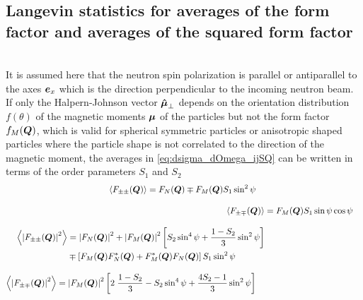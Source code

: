 \subsection{Langevin statistics for averages of the form factor and averages of the squared form factor}
~\\

 It is assumed here that the neutron spin polarization is
parallel or antiparallel to the axes $\BM{e}_x$ which is the
direction perpendicular to the incoming neutron beam. If only the
Halpern-Johnson vector $\BM{\hat{\mu}}_\perp$ depends on the
orientation distribution $f(\theta)$ of the magnetic moments
$\BM{\mu}$ of the particles but not the form factor $f_M(\BM{Q})$,
which is valid for spherical symmetric particles or anisotropic
shaped particles where the particle shape is not correlated to the
direction of the magnetic moment, the averages in
\ref{eq:dsigma_dOmega_ijSQ} can be written in terms of the order
parameters $S_1$ and $S_2$
\begin{subequations}
\label{eq:plugin:F_ijSQ}
\begin{align}
\begin{split}
\left\langle F_{\pm\pm}(\BM{Q})\right\rangle &=  F_N(\BM{Q})
\mp F_M(\BM{Q})S_1\sin^2\psi
\end{split} \\[3mm]
\left\langle F_{\pm\mp}(\BM{Q})\right\rangle &= F_M(\BM{Q})S_1\sin\psi\cos\psi  \\[3mm]
\begin{split}
\left\langle \abs{F_{\pm\pm}(\BM{Q})}^2\right\rangle &= \abs{F_N(\BM{Q})}^2+\abs{F_M(\BM{Q})}^2 \left[S_2 \sin^4\psi+ \frac{1-S_2}{3} \sin^2\psi\right] \\
                                       & \mp \left[F_M(\BM{Q})F^*_N(\BM{Q})+F^*_M(\BM{Q})F_N(\BM{Q})\right]S_1\sin^2\psi
\end{split} \\[3mm]
\begin{split}
\left\langle \abs{F_{\pm\mp}(\BM{Q})}^2\right\rangle
&=\abs{F_M(\BM{Q})}^2
\left[2\;\frac{1-S_2}{3}-S_2\sin^4\psi+\frac{4S_2-1}{3}\sin^2\psi\right]
\end{split}
\end{align}
\end{subequations}

